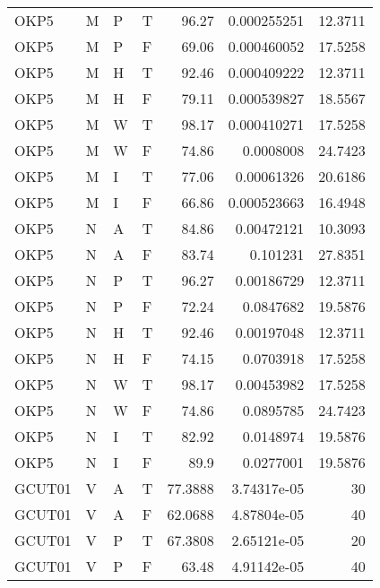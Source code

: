 \begin{longtable}{llllrrr}
    OKP5     & M     & P     & T          & 96.27      & 0.000255251 & 12.3711  \\
    OKP5     & M     & P     & F          & 69.06      & 0.000460052 & 17.5258  \\
    OKP5     & M     & H     & T          & 92.46      & 0.000409222 & 12.3711  \\
    OKP5     & M     & H     & F          & 79.11      & 0.000539827 & 18.5567  \\
    OKP5     & M     & W     & T          & 98.17      & 0.000410271 & 17.5258  \\
    OKP5     & M     & W     & F          & 74.86      & 0.0008008   & 24.7423  \\
    OKP5     & M     & I     & T          & 77.06      & 0.00061326  & 20.6186  \\
    OKP5     & M     & I     & F          & 66.86      & 0.000523663 & 16.4948  \\
    OKP5     & N     & A     & T          & 84.86      & 0.00472121  & 10.3093  \\
    OKP5     & N     & A     & F          & 83.74      & 0.101231    & 27.8351  \\
    OKP5     & N     & P     & T          & 96.27      & 0.00186729  & 12.3711  \\
    OKP5     & N     & P     & F          & 72.24      & 0.0847682   & 19.5876  \\
    OKP5     & N     & H     & T          & 92.46      & 0.00197048  & 12.3711  \\
    OKP5     & N     & H     & F          & 74.15      & 0.0703918   & 17.5258  \\
    OKP5     & N     & W     & T          & 98.17      & 0.00453982  & 17.5258  \\
    OKP5     & N     & W     & F          & 74.86      & 0.0895785   & 24.7423  \\
    OKP5     & N     & I     & T          & 82.92      & 0.0148974   & 19.5876  \\
    OKP5     & N     & I     & F          & 89.9       & 0.0277001   & 19.5876  \\
    GCUT01   & V     & A     & T          & 77.3888    & 3.74317e-05 & 30       \\
    GCUT01   & V     & A     & F          & 62.0688    & 4.87804e-05 & 40       \\
    GCUT01   & V     & P     & T          & 67.3808    & 2.65121e-05 & 20       \\
    GCUT01   & V     & P     & F          & 63.48      & 4.91142e-05 & 40       \\

\end{longtable}
